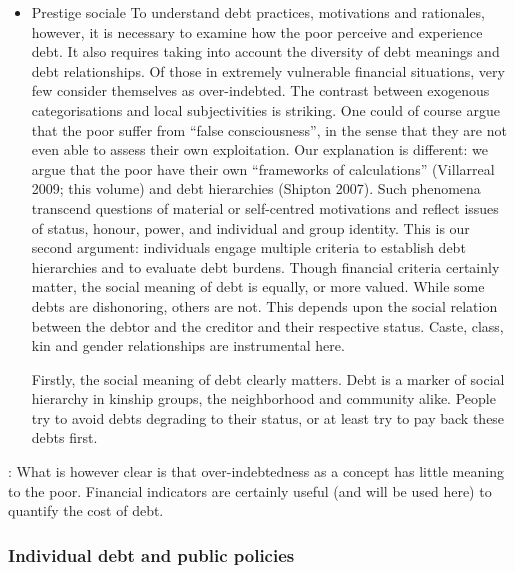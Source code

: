 \documentclass[a4paper, 11pt, onecolumn]{article}
\begin{document}
\begin{itemize}
\item Prestige sociale
\cite{Guerin2014a}
To understand debt practices, motivations and rationales, however, it is necessary to examine
how the poor perceive and experience debt. It also requires taking into account the diversity
of debt meanings and debt relationships. Of those in extremely vulnerable financial situations,
very few consider themselves as over-indebted. The contrast between exogenous
categorisations and local subjectivities is striking. One could of course argue that the poor
suffer from “false consciousness”, in the sense that they are not even able to assess their own
exploitation. Our explanation is different: we argue that the poor have their own “frameworks
of calculations” (Villarreal 2009; this volume) and debt hierarchies (Shipton 2007). Such
phenomena transcend questions of material or self-centred motivations and reflect issues of
status, honour, power, and individual and group identity. This is our second argument:
individuals engage multiple criteria to establish debt hierarchies and to evaluate debt burdens.
Though financial criteria certainly matter, the social meaning of debt is equally, or more
valued. While some debts are dishonoring, others are not. This depends upon the social
relation between the debtor and the creditor and their respective status. Caste, class, kin and
gender relationships are instrumental here.

\cite{Guerin2014}
Firstly, the social meaning of debt clearly matters. Debt is a marker of social hierarchy in
kinship groups, the neighborhood and community alike. People try to avoid debts degrading
to their status, or at least try to pay back these debts first.

\end{itemize}


\cite{Guerin2014a} : What is however clear is that over-indebtedness as a concept has little meaning to the poor.
Financial indicators are certainly useful (and will be used here) to quantify the cost of debt.




	\subsubsection{Individual debt and public policies}
\end{document}
